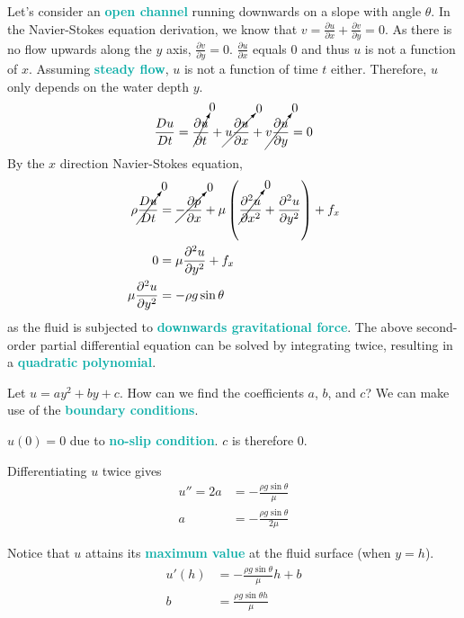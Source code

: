 \documentclass[twoside]{article}
\newcommand{\highlightbluetext}[1]{\textcolor[HTML]{09ACA6}{\textbf{#1}}}
\numberwithin{equation}{section}
\begin{document}
	Let's consider an \highlightbluetext{open channel} running downwards on a slope with angle $\theta$. In the Navier-Stokes equation derivation, we know that $v = \frac{\partial u}{\partial x}+\frac{\partial v}{\partial y} = 0$. As there is no flow upwards along the $y$ axis, $\frac{\partial v}{\partial y} = 0$. $\frac{\partial u}{\partial x}$ equals 0 and thus $u$ is not a function of $x$. Assuming \highlightbluetext{steady flow}, $u$ is not a function of time $t$ either. Therefore, $u$ only depends on the water depth $y$.
	\begin{equation*}
		\frac{Du}{Dt} = \cancelto{0}{\frac{\partial u}{\partial t}}+\cancelto{0}{u\frac{\partial u}{\partial x}}+\cancelto{0}{v\frac{\partial u}{\partial y}} = 0
	\end{equation*}
	By the $x$ direction Navier-Stokes equation,
	\begin{align*}
		\rho \cancelto{0}{\frac{Du}{Dt}} &= \cancelto{0}{-\frac{\partial p}{\partial x}}+\mu \left( \cancelto{0}{\frac{\partial^2 u}{\partial x^2}}+\frac{\partial^2 u}{\partial y^2} \right)+f_x \\
		0 &= \mu \frac{\partial^2 u}{\partial y^2}+f_x \\
		\mu \frac{\partial^2 u}{\partial y^2} &= -\rho g \sin \theta
	\end{align*}
	as the fluid is subjected to \highlightbluetext{downwards gravitational force}. The above second-order partial differential equation can be solved by integrating twice, resulting in a \highlightbluetext{quadratic polynomial}.
	
	Let $u = ay^2+by+c$. How can we find the coefficients $a$, $b$, and $c$? We can make use of the \highlightbluetext{boundary conditions}.
	
	$u(0) = 0$ due to \highlightbluetext{no-slip condition}. $c$ is therefore 0.
	
	Differentiating $u$ twice gives
	\begin{align*}
		u'' = 2a &= -\frac{\rho g \sin \theta}{\mu} \\
		a &= -\frac{\rho g \sin \theta}{2\mu}
	\end{align*}
	
	Notice that $u$ attains its \highlightbluetext{maximum value} at the fluid surface (when $y = h$).
	\begin{align*}
		u'(h) &= -\frac{\rho g \sin \theta}{\mu} h+b \\
		b &= \frac{\rho g \sin \theta h}{\mu}
	\end{align*}
	
\end{document}
